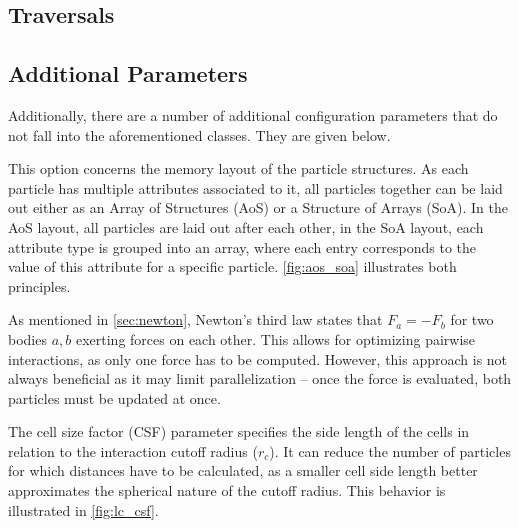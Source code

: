 \subsection{Traversals}

\subsection{Additional Parameters}
Additionally, there are a number of additional configuration parameters that do not fall into the aforementioned classes. They are given below.

\begin{description}[leftmargin=!,labelwidth=\widthof{\textbf{Cell Size Factor}}]
	\item[\textbf{Data Layout}] This option concerns the memory layout of the particle structures. As each particle has multiple attributes associated to it, all particles together can be laid out either as an Array of Structures (AoS) or a Structure of Arrays (SoA). In the AoS layout, all particles are laid out after each other, in the SoA layout, each attribute type is grouped into an array, where each entry corresponds to the value of this attribute for a specific particle. \autoref{fig:aos_soa} illustrates both principles.
	\item[\textbf{Newton3}] As mentioned in \autoref{sec:newton}, Newton's third law states that $F_a = -F_b$ for two bodies $a, b$ exerting forces on each other. This allows for optimizing pairwise interactions, as only one force has to be computed. However, this approach is not always beneficial as it may limit parallelization -- once the force is evaluated, both particles must be updated at once.
	\item[\textbf{Cell Size Factor}] The cell size factor (CSF) parameter specifies the side length of the cells in relation to the interaction cutoff radius ($r_c$). It can reduce the number of particles for which distances have to be calculated, as a smaller cell side length better approximates the spherical nature of the cutoff radius. This behavior is illustrated in  \autoref{fig:lc_csf}.
\end{description}


